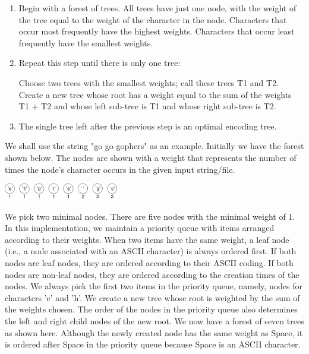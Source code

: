 \documentclass[11pt]{article}
\begin{document}
\begin{enumerate}

\item Begin with a forest of trees.  All trees have just one node,
  with the weight of the tree equal to the weight of the character in
  the node.  Characters that occur most frequently have the highest
  weights. Characters that occur least frequently have the smallest
  weights.

\item Repeat this step until there is only one tree: 
  
  Choose two trees with the smallest weights; call these trees T1 and
  T2. Create a new tree whose root has a weight equal to the sum of
  the weights T1 + T2 and whose left sub-tree is T1 and whose right
  sub-tree is T2.

\item The single tree left after the previous step is an optimal
  encoding tree.

\end{enumerate} 

We shall use the string "go go gophers" as an example.  Initially we
have the forest shown below.  The nodes are shown with a weight that
represents the number of times the node's character occurs in the
given input string/file.

\begin{center}
  \includegraphics[width=5cm]{figures/ngopher1}
\end{center}

We pick two minimal nodes. There are five nodes with the minimal
weight of 1.  In this implementation, we maintain a priority queue
with items arranged according to their weights.  When two items have
the same weight, a leaf node (i.e., a node associated with an ASCII
character) is always ordered first.  If both nodes are leaf nodes,
they are ordered according to their ASCII coding.  If both nodes are
non-leaf nodes, they are ordered according to the creation times of
the nodes.  We always pick the first two items in the priority queue,
namely, nodes for characters 'e' and 'h'.  We create a new tree whose
root is weighted by the sum of the weights chosen.  The order of the
nodes in the priority queue also determines the left and right child
nodes of the new root.  We now have a forest of seven trees as shown
here.  Although the newly created node has the same weight as Space,
it is ordered after Space in the priority queue because Space is an
ASCII character.
\end{document}
